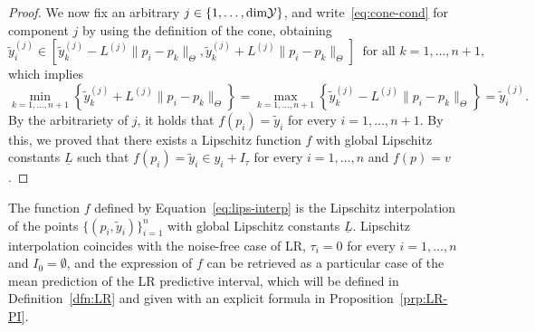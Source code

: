 \begin{proof}
    We now fix an arbitrary $j \in \{1, \dots, \text{dim} \mathcal Y\}$, and write~\eqref{eq:cone-cond} for component $j$ by using the definition of the cone, obtaining
    \[
        \tilde y_i^{(j)} \in \left[ \tilde y_k^{(j)} - L^{(j)} \|p_i - p_k \|_\Theta, \tilde y_k^{(j)} + L^{(j)} \|p_i - p_k \|_\Theta \right] \ \text{ for all } k = 1, \dots, n+1,
    \] 
    which implies 
    \[
        \min_{k=1,\dots,n+1} \left\{ \tilde y_k^{(j)} + L^{(j)} \|p_i - p_k \|_\Theta \right\} =  \max_{k=1,\dots,n+1} \left\{ \tilde y_k^{(j)} - L^{(j)} \|p_i - p_k \|_\Theta \right\} = \tilde y_i^{(j)}.
    \]
    By the arbitrariety of $j$, it holds that $f(p_i) = \tilde y_i$ for every $i = 1, \dots, n+1$. \newline
    By this, we proved that there exists a Lipschitz function $f$ with global Lipschitz constants $\underline L$ such that $f(p_i) = \tilde y_i \in y_i + I_\tau$ for every $i = 1, \dots, n$ and $f(p) = v$.
\end{proof}
\begin{rmk}
    The function $f$ defined by Equation~\eqref{eq:lips-interp} is the Lipschitz interpolation of the points $\{(p_i, \tilde y_i)\}_{i=1}^n$ with global Lipschitz constants $\underline L$. 
    Lipschitz interpolation coincides with the noise-free case of LR, $\tau_i = 0$ for every $i = 1, \dots, n$ and $ I_0 = \emptyset$, and the expression of $f$ can be retrieved as a particular case of the mean prediction of the LR predictive interval, which will be defined in Definition~\ref{dfn:LR} and given with an explicit formula in Proposition~\ref{prp:LR-PI}.
\end{rmk}

